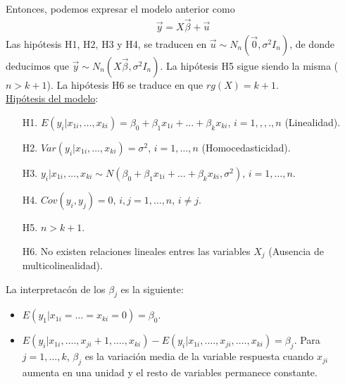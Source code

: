 Entonces, podemos expresar el modelo anterior como
\begin{align*}
    \vec{y} = X \vec{\beta} + \vec{u} 
\end{align*}
Las hipótesis H1, H2, H3 y H4, se traducen en $\vec{u} \sim N_n(\vec{0}, \sigma^2 I_n)$, de donde deducimos que $\vec{y} \sim N_n(X\vec{\beta}, \sigma^2 I_n)$. La hipótesis H5 sigue siendo la misma ($n > k+1$). La hipótesis H6 se traduce en que $rg(X) = k+1$.
\\
\newline
\noindent \underline{Hipótesis del modelo}:
\begin{enumerate}
    \item[H1.] $E(y_i | x_{1i},\ldots,x_{ki}) = \beta_0 + \beta_1 x_{1i} + \ldots + \beta_k x_{ki}$, $i = 1,,,.,n$ (Linealidad).
    \item[H2.] $Var(y_i | x_{1i},\ldots,x_{ki}) = \sigma^2$, $i = 1,\ldots,n$ (Homocedasticidad).
    \item[H3.] $y_i | x_{1i},\ldots,x_{ki} \sim N(\beta_0 + \beta_1 x_{1i} + \ldots + \beta_k x_{ki}, \sigma^2)$, $i = 1,\ldots,n$.
    \item[H4.] $Cov(y_i,y_j) = 0$, $i,j = 1,\ldots,n$, $i \not = j$.
    \item[H5.] $n > k+1$.
    \item[H6.] No existen relaciones lineales entres las variables $X_j$ (Ausencia de multicolinealidad).
\end{enumerate}
La interpretacón de los $\beta_j$ es la siguiente:
\begin{itemize}
    \item $E(y_1 | x_{1i} = \ldots = x_{ki} = 0) = \beta_0$.
    \item $E(y_i | x_{1i}, \ldots., x_{ji} +1, \ldots., x_{ki}) - E(y_i | x_{1i}, \ldots., x_{ji}, \ldots., x_{ki}) = \beta_j$. Para $j=1,\ldots,k$, $\beta_j$ es la variación media de la variable respuesta cuando $x_{ji}$ aumenta en una unidad y el resto de variables permanece constante.
\end{itemize}

